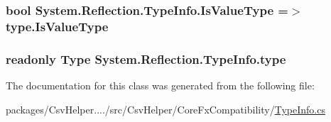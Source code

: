 \hypertarget{a00157_ae2255904b8743c47a185d62909404aed}{
\subsubsection[{Is\-Value\-Type}]{\setlength{\rightskip}{0pt plus 5cm}bool System.\-Reflection.\-Type\-Info.\-Is\-Value\-Type =$>$ type.\-Is\-Value\-Type}}\label{a00157_ae2255904b8743c47a185d62909404aed}
\hypertarget{a00157_a71c4f4b000d08808c8965222d4ba1b8d}{
\subsubsection[{type}]{\setlength{\rightskip}{0pt plus 5cm}readonly Type System.\-Reflection.\-Type\-Info.\-type\hspace{0.3cm}{\ttfamily [private]}}}\label{a00157_a71c4f4b000d08808c8965222d4ba1b8d}


The documentation for this class was generated from the following file\-:\begin{DoxyCompactItemize}
\item 
packages/\-Csv\-Helper..../src/\-Csv\-Helper/\-Core\-Fx\-Compatibility/\hyperlink{a00196}{Type\-Info.\-cs}\end{DoxyCompactItemize}
